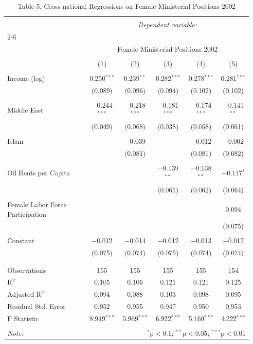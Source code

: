 \documentclass[12pt,letterpaper]{article}
\begin{document}
\begin{table}[!htbp] \centering 
	\caption*{Table 5. Cross-national Regressions on Female Ministerial Positions 2002} 
	\label{} 
	\begin{tabular}{@{\extracolsep{5pt}}lccccc} 
		\\[-1.8ex]\hline 
		\hline \\[-1.8ex] 
		& \multicolumn{5}{c}{\textit{Dependent variable:}} \\ 
		\cline{2-6} 
		\\[-1.8ex] & \multicolumn{5}{c}{Female Ministerial Positions 2002} \\ 
		\\[-1.8ex] & (1) & (2) & (3) & (4) & (5)\\ 
		\hline \\[-1.8ex] 
		Income (log) & 0.250$^{***}$ & 0.239$^{**}$ & 0.282$^{***}$ & 0.278$^{***}$ & 0.281$^{***}$ \\ 
		& (0.089) & (0.096) & (0.094) & (0.102) & (0.102) \\ 
		& & & & & \\ 
		Middle East & $-$0.244$^{***}$ & $-$0.218$^{***}$ & $-$0.181$^{***}$ & $-$0.174$^{***}$ & $-$0.141$^{**}$ \\ 
		& (0.049) & (0.068) & (0.038) & (0.058) & (0.061) \\ 
		& & & & & \\ 
		Islam &  & $-$0.039 &  & $-$0.012 & $-$0.002 \\ 
		&  & (0.081) &  & (0.081) & (0.082) \\ 
		& & & & & \\ 
		Oil Rents per Capita &  &  & $-$0.139$^{**}$ & $-$0.138$^{**}$ & $-$0.117$^{*}$ \\ 
		&  &  & (0.061) & (0.062) & (0.064) \\ 
		& & & & & \\ 
		Female Labor Force Participation &  &  &  &  & 0.094 \\ 
		&  &  &  &  & (0.075) \\ 
		& & & & & \\ 
		Constant & $-$0.012 & $-$0.014 & $-$0.012 & $-$0.013 & $-$0.012 \\ 
		& (0.075) & (0.074) & (0.075) & (0.074) & (0.074) \\ 
		& & & & & \\ 
		\hline \\[-1.8ex] 
		Observations & 155 & 155 & 155 & 155 & 154 \\ 
		R$^{2}$ & 0.105 & 0.106 & 0.121 & 0.121 & 0.125 \\ 
		Adjusted R$^{2}$ & 0.094 & 0.088 & 0.103 & 0.098 & 0.095 \\ 
		Residual Std. Error & 0.952 & 0.955 & 0.947 & 0.950 & 0.953 \\ 
		F Statistic & 8.949$^{***}$ & 5.969$^{***}$ & 6.922$^{***}$ & 5.160$^{***}$ & 4.222$^{***}$ \\ 
		\hline 
		\hline \\[-1.8ex] 
		\textit{Note:}  & \multicolumn{5}{r}{$^{*}$p$<$0.1; $^{**}$p$<$0.05; $^{***}$p$<$0.01} \\ 
	\end{tabular} 
\end{table} 
\newpage
\end{document}
